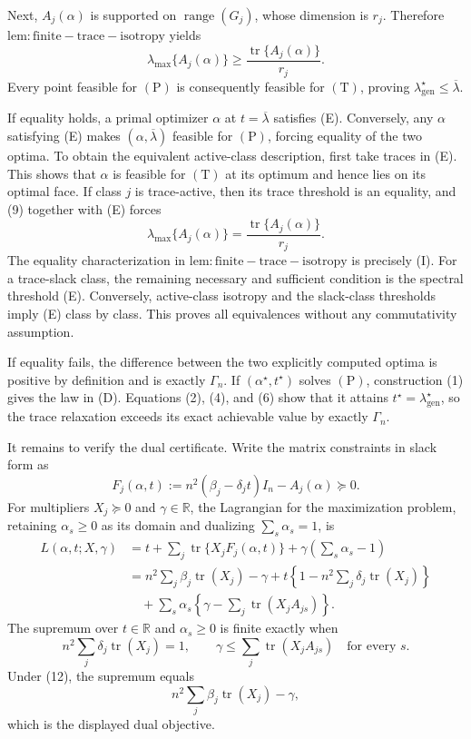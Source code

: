 Next, \(A_j(\alpha)\) is supported on \(\operatorname{range}(G_j)\), whose dimension is \(r_j\).  Therefore \(\mathrm{lem:finite-trace-isotropy}\) yields
\[
\lambda_{\max}\{A_j(\alpha)\}
\ge\frac{\operatorname{tr}\{A_j(\alpha)\}}{r_j}.
\tag{9}
\]
Every point feasible for \((\mathrm P)\) is consequently feasible for \((\mathrm T)\), proving \(\lambda_{\mathrm{gen}}^\star\le\overline\lambda\).

If equality holds, a primal optimizer \(\alpha\) at \(t=\overline\lambda\) satisfies (E).  Conversely, any \(\alpha\) satisfying (E) makes \((\alpha,\overline\lambda)\) feasible for \((\mathrm P)\), forcing equality of the two optima.  To obtain the equivalent active-class description, first take traces in (E).  This shows that \(\alpha\) is feasible for \((\mathrm T)\) at its optimum and hence lies on its optimal face.  If class \(j\) is trace-active, then its trace threshold is an equality, and (9) together with (E) forces
\[
\lambda_{\max}\{A_j(\alpha)\}
=\frac{\operatorname{tr}\{A_j(\alpha)\}}{r_j}.
\]
The equality characterization in \(\mathrm{lem:finite-trace-isotropy}\) is precisely (I).  For a trace-slack class, the remaining necessary and sufficient condition is the spectral threshold (E).  Conversely, active-class isotropy and the slack-class thresholds imply (E) class by class.  This proves all equivalences without any commutativity assumption.

If equality fails, the difference between the two explicitly computed optima is positive by definition and is exactly \(\Gamma_n\).  If \((\alpha^\star,t^\star)\) solves \((\mathrm P)\), construction (1) gives the law in (D).  Equations (2), (4), and (6) show that it attains \(t^\star=\lambda_{\mathrm{gen}}^\star\), so the trace relaxation exceeds its exact achievable value by exactly \(\Gamma_n\).

It remains to verify the dual certificate.  Write the matrix constraints in slack form as
\[
F_j(\alpha,t)
:=n^2(\beta_j-\delta_jt)I_n-A_j(\alpha)\succeq0.
\tag{10}
\]
For multipliers \(X_j\succeq0\) and \(\gamma\in\mathbb R\), the Lagrangian for the maximization problem, retaining \(\alpha_s\ge0\) as its domain and dualizing \(\sum_s\alpha_s=1\), is
\[
\begin{aligned}
L(\alpha,t;X,\gamma)
&=t+\sum_j\operatorname{tr}\{X_jF_j(\alpha,t)\}
+\gamma\left(\sum_s\alpha_s-1\right)\\
&=n^2\sum_j\beta_j\operatorname{tr}(X_j)-\gamma
+t\left\{1-n^2\sum_j\delta_j\operatorname{tr}(X_j)\right\}\\
&\quad+\sum_s\alpha_s
\left\{\gamma-\sum_j\operatorname{tr}(X_jA_{js})\right\}.
\end{aligned}
\tag{11}
\]
The supremum over \(t\in\mathbb R\) and \(\alpha_s\ge0\) is finite exactly when
\[
n^2\sum_j\delta_j\operatorname{tr}(X_j)=1,
\qquad
\gamma\le\sum_j\operatorname{tr}(X_jA_{js})
\quad\text{for every }s.
\tag{12}
\]
Under (12), the supremum equals
\[
n^2\sum_j\beta_j\operatorname{tr}(X_j)-\gamma,
\tag{13}
\]
which is the displayed dual objective.

